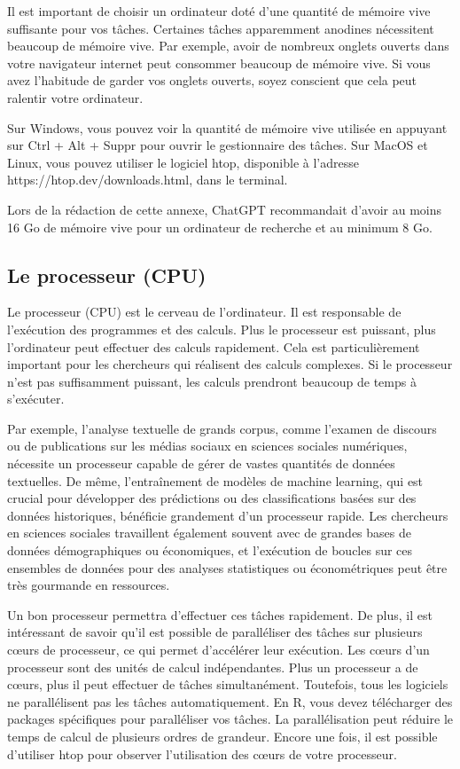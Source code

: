 \documentclass[
  letterpaper,
  DIV=11,
  numbers=noendperiod]{scrreprt}
\begin{document}
Il est important de choisir un ordinateur doté d'une quantité de mémoire
vive suffisante pour vos tâches. Certaines tâches apparemment anodines
nécessitent beaucoup de mémoire vive. Par exemple, avoir de nombreux
onglets ouverts dans votre navigateur internet peut consommer beaucoup
de mémoire vive. Si vous avez l'habitude de garder vos onglets ouverts,
soyez conscient que cela peut ralentir votre ordinateur.

Sur Windows, vous pouvez voir la quantité de mémoire vive utilisée en
appuyant sur Ctrl + Alt + Suppr pour ouvrir le gestionnaire des tâches.
Sur MacOS et Linux, vous pouvez utiliser le logiciel htop, disponible à
l'adresse https://htop.dev/downloads.html, dans le terminal.

Lors de la rédaction de cette annexe, ChatGPT recommandait d'avoir au
moins 16 Go de mémoire vive pour un ordinateur de recherche et au
minimum 8 Go.

\subsection{Le processeur (CPU)}\label{le-processeur-cpu}

Le processeur (CPU) est le cerveau de l'ordinateur. Il est responsable
de l'exécution des programmes et des calculs. Plus le processeur est
puissant, plus l'ordinateur peut effectuer des calculs rapidement. Cela
est particulièrement important pour les chercheurs qui réalisent des
calculs complexes. Si le processeur n'est pas suffisamment puissant, les
calculs prendront beaucoup de temps à s'exécuter.

Par exemple, l'analyse textuelle de grands corpus, comme l'examen de
discours ou de publications sur les médias sociaux en sciences sociales
numériques, nécessite un processeur capable de gérer de vastes quantités
de données textuelles. De même, l'entraînement de modèles de machine
learning, qui est crucial pour développer des prédictions ou des
classifications basées sur des données historiques, bénéficie grandement
d'un processeur rapide. Les chercheurs en sciences sociales travaillent
également souvent avec de grandes bases de données démographiques ou
économiques, et l'exécution de boucles sur ces ensembles de données pour
des analyses statistiques ou économétriques peut être très gourmande en
ressources.

Un bon processeur permettra d'effectuer ces tâches rapidement. De plus,
il est intéressant de savoir qu'il est possible de paralléliser des
tâches sur plusieurs cœurs de processeur, ce qui permet d'accélérer leur
exécution. Les cœurs d'un processeur sont des unités de calcul
indépendantes. Plus un processeur a de cœurs, plus il peut effectuer de
tâches simultanément. Toutefois, tous les logiciels ne parallélisent pas
les tâches automatiquement. En R, vous devez télécharger des packages
spécifiques pour paralléliser vos tâches. La parallélisation peut
réduire le temps de calcul de plusieurs ordres de grandeur. Encore une
fois, il est possible d'utiliser htop pour observer l'utilisation des
cœurs de votre processeur.
\end{document}
